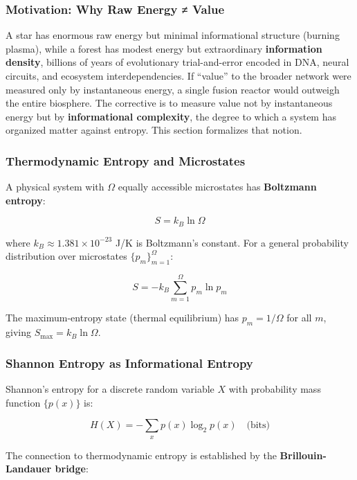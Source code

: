 \documentclass[11pt]{article}
\theoremstyle{plain}
\theoremstyle{definition}
\theoremstyle{remark}
\let\origsubsubsection\subsubsection
\renewcommand{\subsubsection}{\needspace{4\baselineskip}\origsubsubsection}
\begin{document}
\subsubsection{Motivation: Why Raw Energy ≠
Value}\label{motivation-why-raw-energy-value}

A star has enormous raw energy but minimal informational structure
(burning plasma), while a forest has modest energy but extraordinary
\textbf{information density}, billions of years of evolutionary
trial-and-error encoded in DNA, neural circuits, and ecosystem
interdependencies. If ``value'' to the broader network were measured
only by instantaneous energy, a single fusion reactor would outweigh the
entire biosphere. The corrective is to measure value not by
instantaneous energy but by \textbf{informational complexity}, the
degree to which a system has organized matter against entropy. This
section formalizes that notion.

\subsubsection{Thermodynamic Entropy and
Microstates}\label{thermodynamic-entropy-and-microstates}

A physical system with \(\Omega\) equally accessible microstates has
\textbf{Boltzmann entropy}:

\[S = k_B \ln \Omega\]

where \(k_B \approx 1.381 \times 10^{-23}\) J/K is Boltzmann's constant.
For a general probability distribution over microstates
\(\{p_m\}_{m=1}^{\Omega}\):

\[S = -k_B \sum_{m=1}^{\Omega} p_m \ln p_m\]

The maximum-entropy state (thermal equilibrium) has \(p_m = 1/\Omega\)
for all \(m\), giving \(S_{\max} = k_B \ln \Omega\).

\subsubsection{Shannon Entropy as Informational
Entropy}\label{shannon-entropy-as-informational-entropy}

Shannon's entropy for a discrete random variable \(X\) with probability
mass function \(\{p(x)\}\) is:

\[H(X) = -\sum_{x} p(x) \log_2 p(x) \quad \text{(bits)}\]

The connection to thermodynamic entropy is established by the
\textbf{Brillouin-Landauer bridge}:
\end{document}
